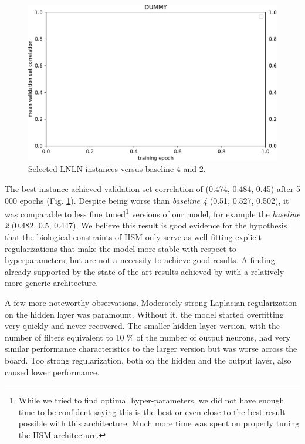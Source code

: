 \begin{figure}[H]
    \centering
    \includegraphics[width=1\textwidth]{../figures/05_dummy}
    \caption[Experiment 2.1.1]{Selected LNLN instances versus baseline 4 and 2.}
    \label{fig:5.2.1.1}
\end{figure}

The best instance achieved validation set correlation of (0.474, 0.484, 0.45) after 5 000 epochs (Fig. \ref{fig:5.2.1.1}). Despite being worse than \textit{baseline 4} (0.51, 0.527, 0.502), it was comparable to less fine tuned\footnote{While we tried to find optimal hyper-parameters, we did not have enough time to be confident saying this is the best or even close to the best result possible with this architecture. Much more time was spent on properly tuning the HSM architecture.} versions of our model, for example the \textit{baseline 2} (0.482, 0.5, 0.447). We believe this result is good evidence for the hypothesis that the biological constraints of HSM only serve as well fitting explicit regularizations that make the model more stable with respect to hyperparameters, but are not a necessity to achieve good results. A finding already supported by the state of the art results achieved by \cite{klidnt} with a relatively more generic architecture.

A few more noteworthy observations. Moderately strong Laplacian regularization on the hidden layer was paramount. Without it, the model started overfitting very quickly and never recovered. The smaller hidden layer version, with the number of filters equivalent to 10 \% of the number of output neurons, had very similar performance characteristics to the larger version but was worse across the board. Too strong regularization, both on the hidden and the output layer, also caused lower performance.

